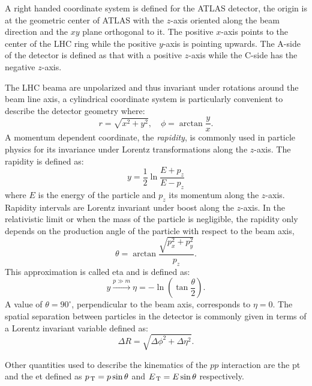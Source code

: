 A right handed coordinate system is defined for the ATLAS detector, the origin
is at the geometric center of ATLAS with the $z$-axis oriented along the beam
direction and the $xy$ plane orthogonal to it. The positive $x$-axis points to
the center of the LHC ring while the positive $y$-axis is pointing upwards. The
A-side of the detector is defined as that with a positive $z$-axis while the
C-side has the negative $z$-axis.

The LHC beama are unpolarized and thus invariant under rotations around the beam
line axis, a cylindrical coordinate system is particularly convenient to
describe the detector geometry where:
\begin{equation}
  \label{eq:73}
  r = \sqrt{x^2 + y^2}, \quad \phi = \arctan \frac{y}{x}.
\end{equation}
A momentum dependent coordinate, the \emph{rapidity}, is commonly used in
particle physics for its invariance under Lorentz transformations along the
$z$-axis. The rapidity is defined as:
\begin{equation}
  \label{eq:74}
  y = \frac{1}{2} \ln \frac{E + p_z}{E - p_z}
\end{equation}
where $E$ is the energy of the particle and $p_z$ its momentum along the
$z$-axis. Rapidity intervals are Lorentz invariant under boost along the
$z$-axis. In the relativistic limit or when the mass of the particle is
negligible, the rapidity only depends on the production angle of the particle
with respect to the beam axis,
\begin{equation}
  \label{eq:75}
  \theta = \arctan \frac{\sqrt{p_x^2 + p_y^2}}{p_z}.
\end{equation}
This approximation is called \gls{eta} and is defined as:
\begin{equation}
  \label{eq:76}
  y \xrightarrow{p \gg m} \eta = - \ln \left( \tan \frac{\theta}{2} \right).
\end{equation}
A value of $\theta = 90^{\circ}$, perpendicular to the beam axis, corresponds to
$\eta = 0$. The spatial separation between particles in the detector is commonly
given in terms of a Lorentz invariant variable defined as:
\begin{equation}
  \label{eq:77}
  \Delta R = \sqrt{\Delta \phi^2 + \Delta \eta^2}.
\end{equation}

Other quantities used to describe the kinematics of the $pp$ interaction are the
\gls{pt} and the \gls{et} defined as $p_\mathrm{\, T} = p \sin \theta$ and
$E_\mathrm{\, T} = E \sin \theta$ respectively.
